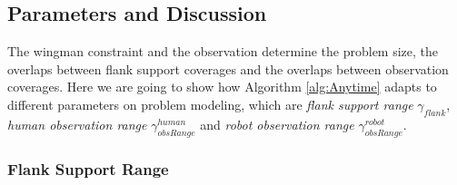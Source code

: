 \documentclass[12pt]{article}
\begin{document}
\subsection{Parameters and Discussion}
\label{subsec:parameters_and_discussion}

The wingman constraint and the observation determine the problem size, the overlaps between flank support coverages and the overlaps between observation coverages.
Here we are going to show how Algorithm \ref{alg:Anytime} adapts to different parameters on problem modeling, which are \emph{flank support range} $ \gamma_{flank} $, \emph{human observation range} $ \gamma^{human}_{obsRange} $  and \emph{robot observation range} $ \gamma^{robot}_{obsRange} $.

\subsubsection{Flank Support Range}
\label{subsubsec:flank_support_range}

\end{document}
